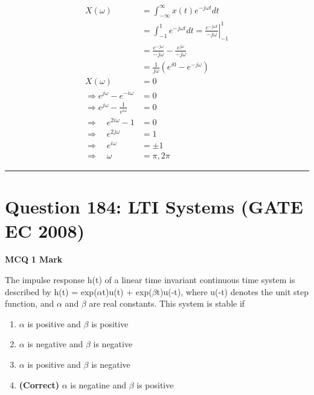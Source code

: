 \documentclass[11pt,a4paper]{article}
\begin{document}
\begin{tcolorbox}[solbox, title=Detailed Solution -- Question 183]
\[
\begin{aligned} X(\omega) &=\int_{-\infty}^{\infty} x(t) e^{-j \omega t} d t \\ &=\int_{-1}^{1} e^{-j \omega t} d t=\left.\frac{e^{-j \omega t}}{-j \omega}\right|_{-1} ^{1} \\ &=\frac{e^{-j \omega}}{-j \omega}-\frac{e^{j \omega}}{-j \omega}\\ &=\frac{1}{j \omega}\left(e^{i 0}-e^{-j \omega}\right) \\ X(\omega) &=0 \\ \Rightarrow e^{j \omega}-e^{-i \omega} &=0 \\ \Rightarrow e^{j \omega}-\frac{1}{e^{i \omega}} &=0 \\ \Rightarrow \quad e^{2 i \omega}-1 &=0 \\ \Rightarrow \quad e^{2 j \omega}&=1 \\ \Rightarrow \quad e^{i \omega}&=\pm 1 \\ \Rightarrow \quad \omega &=\pi, 2 \pi \end{aligned}
\]
\end{tcolorbox}

\vspace{1.5em}
\hrule
\vspace{1.5em}

\section*{Question 184: LTI Systems (GATE EC 2008)}
\noindent \textbf{\color{primary}MCQ} \hfill \textbf{\color{secondary}1 Mark}


\noindent The impulse response h(t) of a linear time invariant continuous time system is described by h(t) = exp($\alpha$t)u(t) + exp($\beta$t)u(-t), where u(-t) denotes the unit step function, and $\alpha$ and $\beta$ are real constants. This system is stable if


\begin{enumerate}[label=(\Alph*)]
    \item $\alpha$ is positive and $\beta$ is positive
    \item $\alpha$ is negative and $\beta$ is negative
    \item $\alpha$ is positive and $\beta$ is negative
    \item \textbf{(Correct)} $\alpha$ is negatine and $\beta$ is positive
\end{enumerate}
\end{document}
